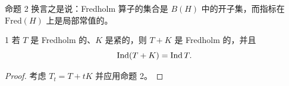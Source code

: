 
命题 2 换言之是说：Fredholm 算子的集合是 $B(H)$ 中的开子集，而指标在 $\mathrm{Fred}(H)$ 上是局部常值的。

\begin{cor}{1} 若 $T$ 是 Fredholm 的、$K$ 是紧的，则 $T+K$ 是 Fredholm 的，并且
\[ \operatorname{Ind}(T+K)=\operatorname{Ind} T. \]
\end{cor}

\begin{proof}
考虑 $T_t=T+tK$ 并应用命题 2。
\end{proof}

